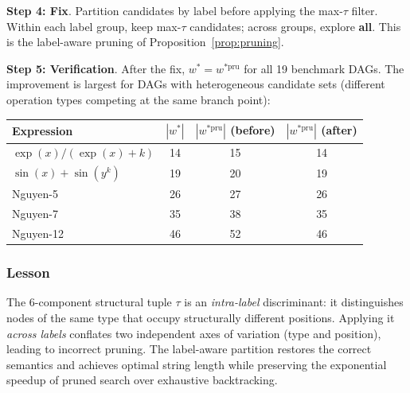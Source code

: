 \textbf{Step 4: Fix}. Partition candidates by label before applying the max-$\tau$
filter. Within each label group, keep max-$\tau$ candidates; across groups, explore
\textbf{all}. This is the label-aware pruning of Proposition~\ref{prop:pruning}.

\textbf{Step 5: Verification}. After the fix, $w^* = w^{*\text{pru}}$ for all 19
benchmark DAGs. The improvement is largest for DAGs with heterogeneous candidate sets
(different operation types competing at the same branch point):

\begin{center}
\begin{tabular}{lccc}
\toprule
Expression & $|w^*|$ & $|w^{*\text{pru}}|$ (before) & $|w^{*\text{pru}}|$ (after) \\
\midrule
$\exp(x)/(\exp(x)+k)$ & 14 & 15 & 14 \\
$\sin(x) + \sin(y^k)$ & 19 & 20 & 19 \\
Nguyen-5              & 26 & 27 & 26 \\
Nguyen-7              & 35 & 38 & 35 \\
Nguyen-12             & 46 & 52 & 46 \\
\bottomrule
\end{tabular}
\end{center}

\subsubsection{Lesson}

The 6-component structural tuple $\tau$ is an \emph{intra-label} discriminant: it
distinguishes nodes of the same type that occupy structurally different positions.
Applying it \emph{across labels} conflates two independent axes of variation (type
and position), leading to incorrect pruning. The label-aware partition restores the
correct semantics and achieves optimal string length while preserving the exponential
speedup of pruned search over exhaustive backtracking.
